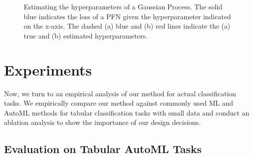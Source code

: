 \documentclass{article}
\begin{document}

\begin{figure}[t]
     \centering
     \begin{subfigure}[t]{0.32\textwidth}
         \centering
         
     \end{subfigure}
     \begin{subfigure}[t]{0.32\textwidth}
         \centering
         
     \end{subfigure}
     \begin{subfigure}[t]{0.32\textwidth}
         \centering
         
     \end{subfigure}
     \vspace{-.5cm}
     \caption{Estimating the hyperparameters of a Gaussian Process. The solid blue indicates the loss of a PFN given the hyperparameter indicated on the x-axis. The dashed (a) blue and (b) red lines indicate the (a) true and (b) estimated hyperparameters.}
     \label{fig:gp_hp_fitting}
\end{figure}


\section{Experiments}\label{sec:experiments}

Now, we turn to an empirical analysis of our method for actual classification tasks. We empirically compare our method against commonly used ML and AutoML methods for tabular classification tasks with small data and conduct an ablation analysis to show the importance of our design decisions.

\subsection{Evaluation on Tabular AutoML Tasks}\label{ssec:tabresults}
\end{document}

